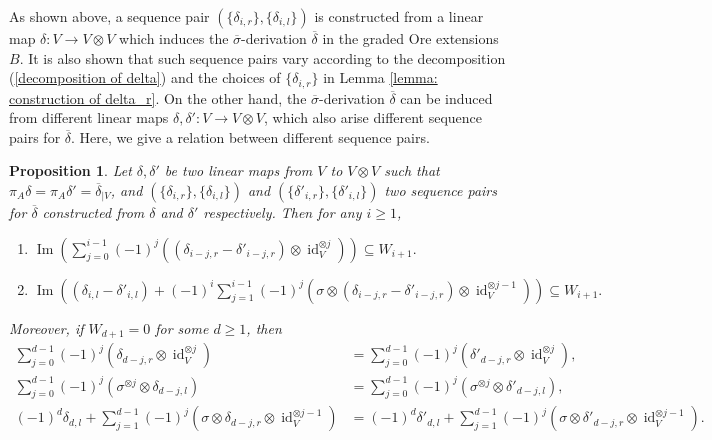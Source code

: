 \documentclass[a4paper,10pt]{amsart}
\newtheorem{proposition}[theorem]{Proposition}
\theoremstyle{definition}
\numberwithin{equation}{section}
\DeclareMathOperator{\Image}{Im} \DeclareMathOperator{\Ext}{Ext}
\DeclareMathOperator{\id}{id}
\begin{document}
As shown above, a sequence pair $\left(\{\delta_{i,r}\},\{\delta_{i,l}\}\right)$ is constructed from a linear map $\delta: V\to V\otimes V$ which induces the $\overline{\sigma}$-derivation $\overline{\delta}$ in the graded Ore extensions $B$. It is also shown that such sequence pairs vary according to the decomposition (\ref{decomposition of delta}) and the choices of $\{\delta_{i,r}\}$ in Lemma \ref{lemma: construction of delta_r}. On the other hand, the $\overline{\sigma}$-derivation $\overline{\delta}$ can be  induced from different linear maps $\delta,\delta':V\to V\otimes V$, which also arise different sequence pairs for $\overline{\delta}$. Here, we give a relation between different sequence pairs.

\begin{proposition}\label{prop: relation betwenn different delta_r} Let $\delta,\delta'$ be two linear maps from $V$ to $V\otimes V$ such that $\pi_A\delta=\pi_A\delta'=\overline{\delta}_{\mid V}$, and $\left(\{\delta_{i,r}\},\{\delta_{i,l}\}\right)$ and $\left(\{\delta'_{i,r}\},\{\delta'_{i,l}\}\right)$ two sequence pairs for $\overline{\delta}$ constructed from $\delta$ and $\delta'$ respectively. Then for any $i\geq1$,
\begin{enumerate}
\item $
\Image\left(\sum_{j=0}^{i-1}(-1)^j\left((\delta_{i-j,r}-\delta'_{i-j,r})\otimes\id_V^{\otimes j}\right)\right)\subseteq W_{i+1}.
$
\item $
\Image\left((\delta_{i,l}-\delta'_{i,l})+(-1)^{i}\sum_{j=1}^{i-1}(-1)^j\left(\sigma\otimes(\delta_{i-j,r}-\delta'_{i-j,r})\otimes\id_V^{\otimes j-1}\right)\right)\subseteq W_{i+1}.
$
\end{enumerate}
Moreover, if $W_{d+1}=0$ for some $d\geq1$, then
\begin{align*}
\sum_{j=0}^{d-1}(-1)^{j}(\delta_{d-j,r}\otimes\id_V^{\otimes j})&=\sum_{j=0}^{d-1}(-1)^{j}(\delta'_{d-j,r}\otimes\id_V^{\otimes j}),\\
\sum_{j=0}^{d-1}(-1)^{j}(\sigma^{\otimes j}\otimes \delta_{d-j,l})&=\sum_{j=0}^{d-1}(-1)^{j}(\sigma^{\otimes j}\otimes \delta'_{d-j,l}),\\
(-1)^{d}\delta_{d,l}+\sum_{j=1}^{d-1}(-1)^{j}\left(\sigma\otimes \delta_{d-j,r}\otimes\id_V^{\otimes j-1}\right)&=(-1)^{d}\delta'_{d,l}+\sum_{j=1}^{d-1}(-1)^{j}\left(\sigma\otimes \delta'_{d-j,r}\otimes\id_V^{\otimes j-1}\right).
\end{align*}
%
%
%
%


\end{proposition}
\end{document}
